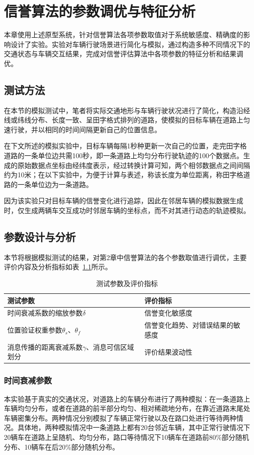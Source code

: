 \chapter{信誉算法的参数调优与特征分析}
本章使用上述原型系统，针对信誉算法各项参数取值对于系统敏感度、精确度的影响设计了实验。实验对车辆行驶场景进行简化与模拟，通过构造多种不同情况下的交通状态与车辆交互结果，完成对信誉评估算法中各项参数的特征分析和结果调优。

\section{测试方法}
在本节的模拟测试中，笔者将实际交通地形与车辆行驶状况进行了简化，构造沿经线或纬线分布、长度一致、呈田字格式排列的道路，使模拟的目标车辆在道路上匀速行驶，并以相同的时间间隔更新自己的位置信息。

在下文所述的模拟实验中，目标车辆每隔1秒种更新一次自己的位置，走完田字格道路的一条单位边共需100秒，即一条道路上均匀分布行驶轨迹的100个数据点。生成的原始数据点坐标由经纬度表示，经过转换计算可知，两个相邻数据点之间间隔约为10米；在以下实验中，为便于计算与表述，称该长度为单位距离，称田字格道路的一条单位边为一条道路。

因为该实验只对目标车辆的信誉变化进行追踪，因此在邻居车辆的模拟数据生成时，仅生成两辆车交互成功时邻居车辆的坐标点，而不对其进行动态的轨迹模拟。

\section{参数设计与分析}
本节将根据模拟测试的结果，对第2章中信誉算法的各个参数取值进行调优，主要评价内容及分析指标如表~\ref{tab:params}所示。

\begin{table}
  \centering
  \caption{测试参数及评价指标}
  \begin{tabular}{ll}
    \toprule
    测试参数          & 评价指标                         \\
    \midrule
    时间衰减系数的缩放参数$\delta$   & 信誉变化敏感度 \\
    位置验证权重参数$\theta_s$、$\theta_f$   & 信誉变化趋势、对错误结果的敏感度                     \\
    消息传播的距离衰减系数$\gamma$、消息可信区域划分   &    评价结果波动性    \\
    \bottomrule
  \end{tabular}
  \label{tab:params}
\end{table}

\subsection{时间衰减参数}
本实验基于真实的交通状况，对道路上的车辆分布进行了两种模拟：在一条道路上车辆均匀分布，或者在道路的前半部分均匀、相对稀疏地分布，在靠近道路末尾处车辆密集分布。两种情况分别模拟了车辆正常行驶以及在路口处进行等待两种情况。具体地，两种模拟情况中一条道路上都有20台邻近车辆，其中正常行驶情况下20辆车在道路上呈随机、均匀分布，路口等待情况下10辆车在道路前80\%部分随机分布、10辆车在后20\%部分随机分布。

